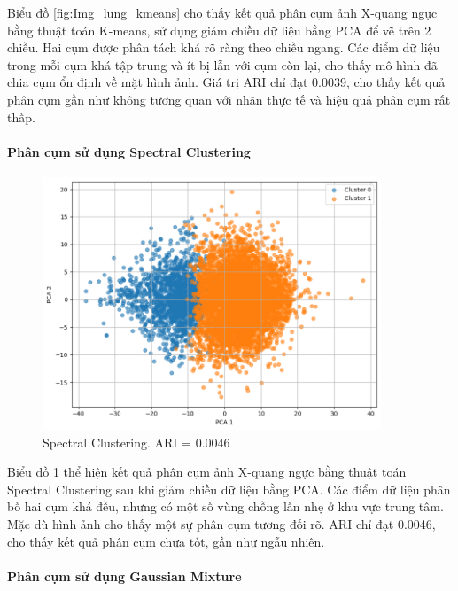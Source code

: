     Biểu đồ \ref{fig:Img_lung_kmeans} cho thấy kết quả phân cụm ảnh X-quang ngực bằng thuật toán K-means, sử dụng giảm chiều dữ liệu bằng PCA để vẽ trên 2 chiều. Hai cụm được phân tách khá rõ ràng theo chiều ngang. Các điểm dữ liệu trong mỗi cụm khá tập trung và ít bị lẫn với cụm còn lại, cho thấy mô hình đã chia cụm ổn định về mặt hình ảnh. Giá trị ARI chỉ đạt 0.0039, cho thấy kết quả phân cụm gần như không tương quan với nhãn thực tế và hiệu quả phân cụm rất thấp.

    \paragraph{Phân cụm sử dụng Spectral Clustering}
    \leavevmode

    \begin{figure}[htp]
        \centering
        \includegraphics[width=0.90\textwidth]{images/Img_lung_spectral.png}
        \caption{Spectral Clustering. ARI = 0.0046}
        \label{fig:Img_lung_spectral}
    \end{figure}
    \FloatBarrier

    Biểu đồ \ref{fig:Img_lung_spectral} thể hiện kết quả phân cụm ảnh X-quang ngực bằng thuật toán Spectral Clustering sau khi giảm chiều dữ liệu bằng PCA. Các điểm dữ liệu phân bố hai cụm khá đều, nhưng có một số vùng chồng lấn nhẹ ở khu vực trung tâm. Mặc dù hình ảnh cho thấy một sự phân cụm tương đối rõ. ARI chỉ đạt 0.0046, cho thấy kết quả phân cụm chưa tốt, gần như ngẫu nhiên.

    \paragraph{Phân cụm sử dụng Gaussian Mixture}
    \leavevmode
    
